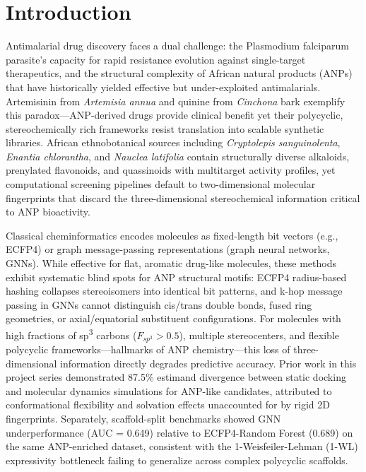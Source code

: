 \section{Introduction}

Antimalarial drug discovery faces a dual challenge: the Plasmodium falciparum parasite's capacity for rapid resistance evolution against single-target therapeutics, and the structural complexity of African natural products (ANPs) that have historically yielded effective but under-exploited antimalarials. Artemisinin from \textit{Artemisia annua} and quinine from \textit{Cinchona} bark exemplify this paradox—ANP-derived drugs provide clinical benefit yet their polycyclic, stereochemically rich frameworks resist translation into scalable synthetic libraries\cite{who_malaria_2024}. African ethnobotanical sources including \textit{Cryptolepis sanguinolenta}, \textit{Enantia chlorantha}, and \textit{Nauclea latifolia} contain structurally diverse alkaloids, prenylated flavonoids, and quassinoids with multitarget activity profiles\cite{betow2025}, yet computational screening pipelines default to two-dimensional molecular fingerprints that discard the three-dimensional stereochemical information critical to ANP bioactivity.

Classical cheminformatics encodes molecules as fixed-length bit vectors (e.g., ECFP4\cite{rogers2010}) or graph message-passing representations (graph neural networks, GNNs\cite{gilmer2017neural}). While effective for flat, aromatic drug-like molecules, these methods exhibit systematic blind spots for ANP structural motifs: ECFP4 radius-based hashing collapses stereoisomers into identical bit patterns, and k-hop message passing in GNNs cannot distinguish cis/trans double bonds, fused ring geometries, or axial/equatorial substituent configurations\cite{morris2019weisfeiler}. For molecules with high fractions of sp\textsuperscript{3} carbons ($F_{sp^3} > 0.5$), multiple stereocenters, and flexible polycyclic frameworks—hallmarks of ANP chemistry—this loss of three-dimensional information directly degrades predictive accuracy. Prior work in this project series demonstrated 87.5\% estimand divergence between static docking and molecular dynamics simulations for ANP-like candidates\cite{sao2026p2}, attributed to conformational flexibility and solvation effects unaccounted for by rigid 2D fingerprints. Separately, scaffold-split benchmarks showed GNN underperformance (AUC = 0.649) relative to ECFP4-Random Forest (0.689) on the same ANP-enriched dataset\cite{sao2026p5}, consistent with the 1-Weisfeiler-Lehman (1-WL) expressivity bottleneck\cite{morris2019weisfeiler} failing to generalize across complex polycyclic scaffolds.


